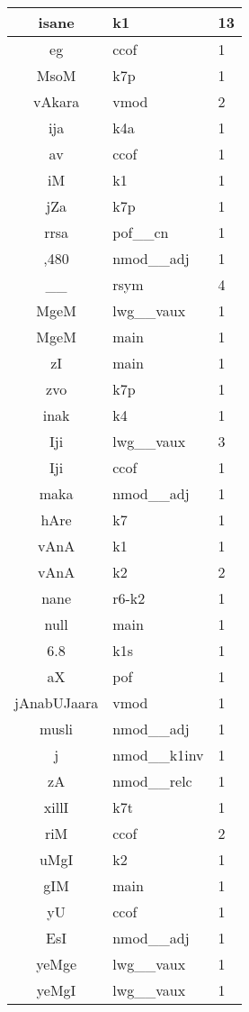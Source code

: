 \documentclass[a4 paper]{article}
\begin{document}
\begin{longtable}{cp{}p{}}
isane & k1 & 13\\ \midrule 
eg & ccof & 1\\ \midrule 
MsoM & k7p & 1\\ \midrule 
vAkara & vmod & 2\\ \midrule 
ija & k4a & 1\\ \midrule 
av & ccof & 1\\ \midrule 
iM & k1 & 1\\ \midrule 
jZa & k7p & 1\\ \midrule 
rrsa & pof\_\_cn & 1\\ \midrule 
,480 & nmod\_\_adj & 1\\ \midrule 
\_\_ & rsym & 4\\ \midrule 
MgeM & lwg\_\_vaux & 1\\ \midrule MgeM & main & 1\\ \midrule 
zI & main & 1\\ \midrule 
zvo & k7p & 1\\ \midrule 
inak & k4 & 1\\ \midrule 
Iji & lwg\_\_vaux & 3\\ \midrule Iji & ccof & 1\\ \midrule 
maka & nmod\_\_adj & 1\\ \midrule 
hAre & k7 & 1\\ \midrule 
vAnA & k1 & 1\\ \midrule vAnA & k2 & 2\\ \midrule 
nane & r6-k2 & 1\\ \midrule 
null & main & 1\\ \midrule 
6.8 & k1s & 1\\ \midrule 
aX & pof & 1\\ \midrule 
jAnabUJaara & vmod & 1\\ \midrule 
musli & nmod\_\_adj & 1\\ \midrule 
j & nmod\_\_k1inv & 1\\ \midrule 
zA & nmod\_\_relc & 1\\ \midrule 
xillI & k7t & 1\\ \midrule 
riM & ccof & 2\\ \midrule 
uMgI & k2 & 1\\ \midrule 
gIM & main & 1\\ \midrule 
yU & ccof & 1\\ \midrule 
EsI & nmod\_\_adj & 1\\ \midrule 
yeMge & lwg\_\_vaux & 1\\ \midrule 
yeMgI & lwg\_\_vaux & 1\\ \midrule 

\end{longtable}
\end{document}
